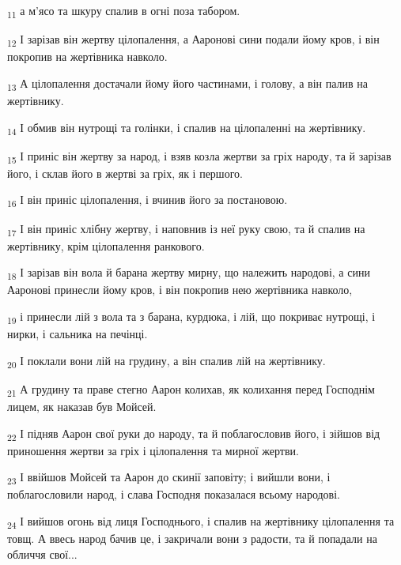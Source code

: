 \begin{tcolorbox}
\textsubscript{11} а м'ясо та шкуру спалив в огні поза табором.
\end{tcolorbox}
\begin{tcolorbox}
\textsubscript{12} І зарізав він жертву цілопалення, а Ааронові сини подали йому кров, і він покропив на жертівника навколо.
\end{tcolorbox}
\begin{tcolorbox}
\textsubscript{13} А цілопалення достачали йому його частинами, і голову, а він палив на жертівнику.
\end{tcolorbox}
\begin{tcolorbox}
\textsubscript{14} І обмив він нутрощі та голінки, і спалив на цілопаленні на жертівнику.
\end{tcolorbox}
\begin{tcolorbox}
\textsubscript{15} І приніс він жертву за народ, і взяв козла жертви за гріх народу, та й зарізав його, і склав його в жертві за гріх, як і першого.
\end{tcolorbox}
\begin{tcolorbox}
\textsubscript{16} І він приніс цілопалення, і вчинив його за постановою.
\end{tcolorbox}
\begin{tcolorbox}
\textsubscript{17} І він приніс хлібну жертву, і наповнив із неї руку свою, та й спалив на жертівнику, крім цілопалення ранкового.
\end{tcolorbox}
\begin{tcolorbox}
\textsubscript{18} І зарізав він вола й барана жертву мирну, що належить народові, а сини Ааронові принесли йому кров, і він покропив нею жертівника навколо,
\end{tcolorbox}
\begin{tcolorbox}
\textsubscript{19} і принесли лій з вола та з барана, курдюка, і лій, що покриває нутрощі, і нирки, і сальника на печінці.
\end{tcolorbox}
\begin{tcolorbox}
\textsubscript{20} І поклали вони лій на грудину, а він спалив лій на жертівнику.
\end{tcolorbox}
\begin{tcolorbox}
\textsubscript{21} А грудину та праве стегно Аарон колихав, як колихання перед Господнім лицем, як наказав був Мойсей.
\end{tcolorbox}
\begin{tcolorbox}
\textsubscript{22} І підняв Аарон свої руки до народу, та й поблагословив його, і зійшов від приношення жертви за гріх і цілопалення та мирної жертви.
\end{tcolorbox}
\begin{tcolorbox}
\textsubscript{23} І ввійшов Мойсей та Аарон до скинії заповіту; і вийшли вони, і поблагословили народ, і слава Господня показалася всьому народові.
\end{tcolorbox}
\begin{tcolorbox}
\textsubscript{24} І вийшов огонь від лиця Господнього, і спалив на жертівнику цілопалення та товщ. А ввесь народ бачив це, і закричали вони з радости, та й попадали на обличчя свої...
\end{tcolorbox}
